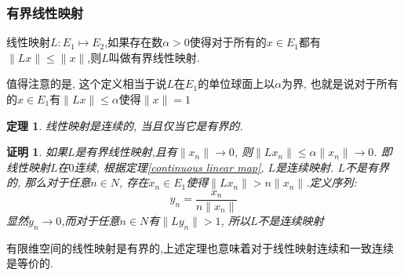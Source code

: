 \documentclass[a4paper,11pt]{article}
\theoremstyle{mystyle}
\newtheorem{theorem}{\hspace{2em}定理}[section]
\newtheorem{Proof}{\hspace{2em}证明}[section]
\begin{document}
\subsubsection*{有界线性映射}
\begin{definition}
  线性映射$L:E_1\mapsto E_2$,如果存在数$\alpha>0$使得对于所有的$x\in E_1$都有$\|Lx\|\leq\|x\|$,则$L$叫做有界线性映射.
\end{definition}
值得注意的是, 这个定义相当于说$L$在$E_1$的单位球面上以$\alpha$为界, 也就是说对于所有的$x\in E_1$有$\|Lx\|\leq\alpha$使得$\|x\|=1$
\begin{theorem}
  线性映射是连续的, 当且仅当它是有界的.
\end{theorem}
\begin{Proof}
  如果$L$是有界线性映射,且有$\|x_n\|\to 0$, 则$\|Lx_n\|\leq\alpha\|x_n\|\to 0$. 即线性映射$L$在$0$连续, 根据定理\ref{continuous linear map}, $L$是连续映射.
  $L$不是有界的, 那么对于任意$n\in N$, 存在$x_n\in E_1$使得$\|Lx_n\|>n\|x_n\|$.定义序列:
  \begin{equation*}
    y_n=\frac{x_n}{n\|x_n\|}
  \end{equation*}
  显然$y_n\to 0$,而对于任意$n\in N$有$\|Ly_n\|>1$, 所以$L$不是连续映射
\end{Proof}
有限维空间的线性映射是有界的,上述定理也意味着对于线性映射连续和一致连续是等价的.
\end{document}
